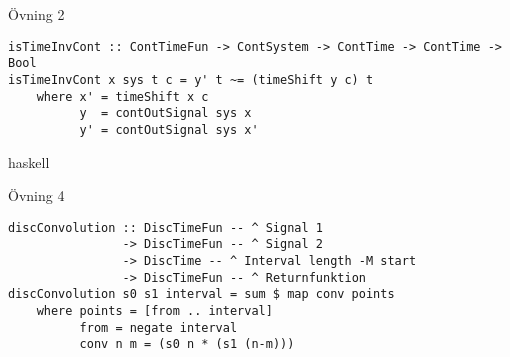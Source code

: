 \documentclass{article}
\begin{document}
Övning 2
\begin{verbatim}
isTimeInvCont :: ContTimeFun -> ContSystem -> ContTime -> ContTime -> Bool
isTimeInvCont x sys t c = y' t ~= (timeShift y c) t
    where x' = timeShift x c
          y  = contOutSignal sys x
          y' = contOutSignal sys x'
\end{verbatim}{haskell}

Övning 4
\begin{verbatim}
discConvolution :: DiscTimeFun -- ^ Signal 1
                -> DiscTimeFun -- ^ Signal 2
                -> DiscTime -- ^ Interval length -M start
                -> DiscTimeFun -- ^ Returnfunktion
discConvolution s0 s1 interval = sum $ map conv points
    where points = [from .. interval]
          from = negate interval
          conv n m = (s0 n * (s1 (n-m)))
\end{verbatim}
\end{document}

